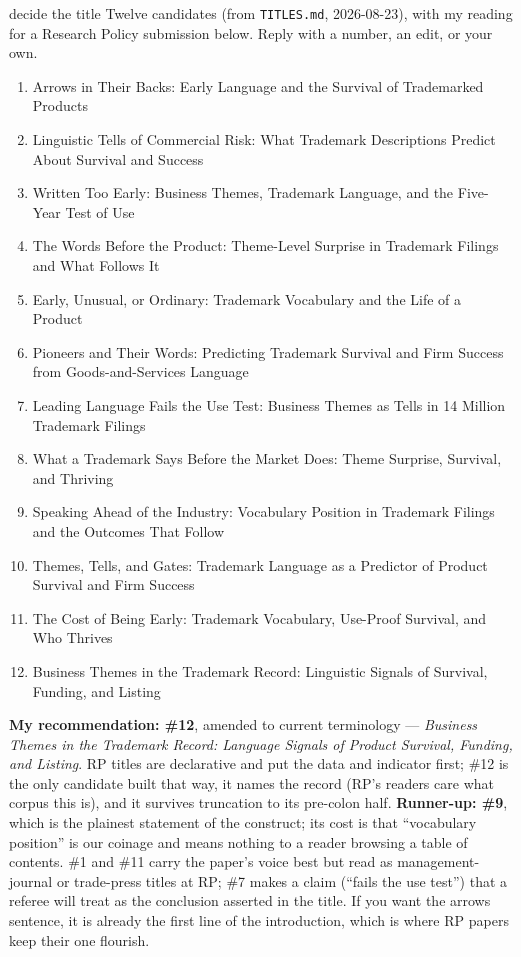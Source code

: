 \begin{ericbox}{decide the title}
Twelve candidates (from \texttt{TITLES.md}, 2026-08-23), with my reading for
a Research Policy submission below. Reply with a number, an edit, or your own.

\begin{enumerate}[nosep]
\item Arrows in Their Backs: Early Language and the Survival of Trademarked Products
\item Linguistic Tells of Commercial Risk: What Trademark Descriptions Predict About Survival and Success
\item Written Too Early: Business Themes, Trademark Language, and the Five-Year Test of Use
\item The Words Before the Product: Theme-Level Surprise in Trademark Filings and What Follows It
\item Early, Unusual, or Ordinary: Trademark Vocabulary and the Life of a Product
\item Pioneers and Their Words: Predicting Trademark Survival and Firm Success from Goods-and-Services Language
\item Leading Language Fails the Use Test: Business Themes as Tells in 14 Million Trademark Filings
\item What a Trademark Says Before the Market Does: Theme Surprise, Survival, and Thriving
\item Speaking Ahead of the Industry: Vocabulary Position in Trademark Filings and the Outcomes That Follow
\item Themes, Tells, and Gates: Trademark Language as a Predictor of Product Survival and Firm Success
\item The Cost of Being Early: Trademark Vocabulary, Use-Proof Survival, and Who Thrives
\item Business Themes in the Trademark Record: Linguistic Signals of Survival, Funding, and Listing
\end{enumerate}

\textbf{My recommendation: \#12}, amended to current terminology ---
\emph{Business Themes in the Trademark Record: Language Signals of Product
Survival, Funding, and Listing}. RP titles are declarative and put the data
and indicator first; \#12 is the only candidate built that way, it names the
record (RP's readers care what corpus this is), and it survives truncation
to its pre-colon half. \textbf{Runner-up: \#9}, which is the plainest
statement of the construct; its cost is that ``vocabulary position'' is our
coinage and means nothing to a reader browsing a table of contents.
\#1 and \#11 carry the paper's voice best but read as management-journal or
trade-press titles at RP; \#7 makes a claim (``fails the use test'') that a
referee will treat as the conclusion asserted in the title. If you want the
arrows sentence, it is already the first line of the introduction, which is
where RP papers keep their one flourish.
\end{ericbox}
